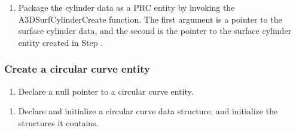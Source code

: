\documentclass[letterpaper,12pt,english,openany,oneside]{sphinxmanual}
\begin{document}
\begin{sphinxVerbatim}[commandchars=\\\{\}]
  
\end{sphinxVerbatim}
\begin{enumerate}
%
\setcounter{enumi}{4}
\item {} 
Package the cylinder data as a PRC entity by invoking the A3DSurfCylinderCreate function. The first argument is a pointer to the surface cylinder data, and the second is the pointer to the surface cylinder entity created in Step .

\end{enumerate}

\begin{sphinxVerbatim}[commandchars=\\\{\}]
    
\end{sphinxVerbatim}


\subsubsection{Create a circular curve entity}
\label{\detokenize{Plugins_A3D_API:create-a-circular-curve-entity}}\begin{enumerate}
%
\item {} 
Declare a null pointer to a circular curve entity.

\end{enumerate}

\begin{sphinxVerbatim}[commandchars=\\\{\}]
   
\end{sphinxVerbatim}
\begin{enumerate}
%
\setcounter{enumi}{1}
\item {} 
Declare and initialize a circular curve data structure, and initialize the structures it contains.

\end{enumerate}
\end{document}

